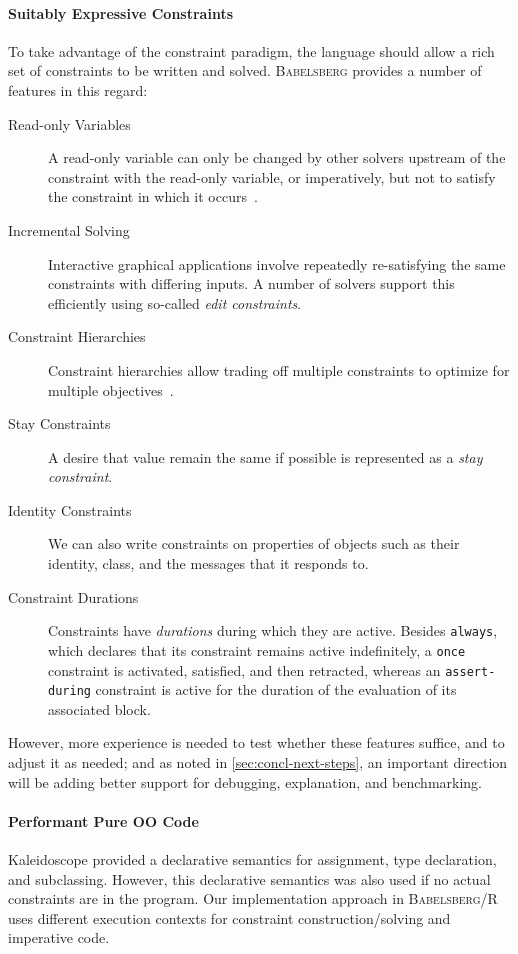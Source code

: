 \documentclass[english, inproceedings]{polze}
\newcommand{\langname}{\textsc{Babelsberg}\xspace}
\newcommand{\toolname}{\textsc{Babelsberg/R}\xspace}
\begin{document}
\paragraph{Suitably Expressive Constraints}
To take advantage of the constraint paradigm, the language should
allow a rich set of constraints to be written and solved. \langname
provides a number of features in this regard:
\begin{description}
\item[Read-only Variables] A read-only variable can only be changed by
  other solvers upstream of the constraint with the read-only
  variable, or imperatively, but not to satisfy the constraint in
  which it occurs~\cite{borning-lisp-symbolic-computation-1992}.
\item[Incremental Solving] Interactive graphical applications involve
  repeatedly re-satisfying the same constraints with differing
  inputs. A number of solvers support this efficiently using so-called
  \emph{edit constraints}.
\item[Constraint Hierarchies] Constraint hierarchies allow trading off
  multiple constraints to optimize for multiple
  objectives~\cite{borning-lisp-symbolic-computation-1992}.
\item[Stay Constraints] A desire that value remain the same if
  possible is represented as a \emph{stay constraint}.
\item[Identity Constraints] We can also write constraints on
  properties of objects such as their identity, class, and the
  messages that it responds to.
\item[Constraint Durations] Constraints have \emph{durations} during
  which they are active.  Besides \lstinline{always}, which declares
  that its constraint remains active indefinitely, a \lstinline{once}
  constraint is activated, satisfied, and then retracted, whereas an
  \lstinline{assert-during} constraint is active for the duration of
  the evaluation of its associated block.
\end{description}

However, more experience is needed to test whether these features
suffice, and to adjust it as needed; and as noted in
\autoref{sec:concl-next-steps}, an important direction will be adding
better support for debugging, explanation, and benchmarking.

\paragraph{Performant Pure OO Code}
Kaleidoscope provided a declarative semantics for assignment, type
declaration, and subclassing. However, this declarative semantics was
also used if no actual constraints are in the program. Our
implementation approach in \toolname uses different execution contexts
for constraint construction/solving and imperative code.
\end{document}
